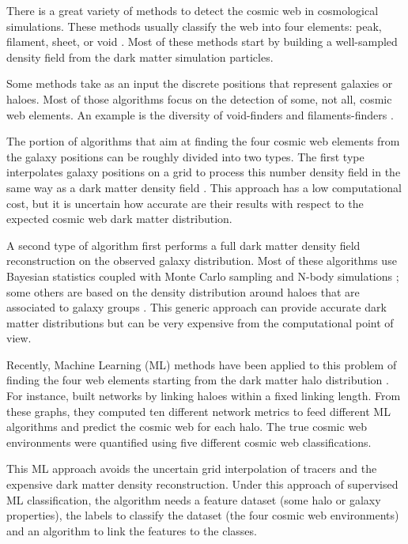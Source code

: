 \documentclass[usenatbib]{mnras}
\begin{document}
There is a great variety of methods to detect
the cosmic web in cosmological simulations.
These methods usually classify the web into four
elements: peak, filament, sheet, or void \citep{Libeskind2018}.
Most of these methods start by building a well-sampled density field from the dark matter simulation particles.

Some methods take as an input the discrete positions that represent galaxies or haloes.
Most of those algorithms focus on the detection of some, not all, cosmic web elements.
An example is the diversity of void-finders
\citep{Platen2007,Neyrinck2008} and filaments-finders
\citep{Novikov2003,Zhang2009,Sousbie2010,Chen2015,Luber2019}.   

The portion of algorithms that aim at finding the four cosmic web elements from the galaxy positions can be roughly divided into two types.
The first type interpolates galaxy positions on a grid to process this number density field in the same way as a dark matter density field \citep{Eardley2015,Alpaslan2016,Tojeiro2017,Shadab2019}.
This approach has a low computational cost, but it is uncertain 
how accurate are their results with respect to the expected cosmic web dark matter distribution.

A second type of algorithm first performs a full dark matter density field reconstruction on the observed galaxy distribution.
Most of these algorithms use Bayesian statistics coupled with Monte
Carlo sampling and N-body
simulations \citep{Jasche2010,Jasche2013a,Bos2014,LeclercqJasche2015,Horowitz2019,Burchett2020};
some others are based on the density distribution around haloes that are associated to galaxy groups \citep{Wang2009,Munoz-Cuartas2011}.
This generic approach can provide accurate dark matter distributions but can
be very expensive from the computational point of view.

Recently, Machine Learning (ML) methods 
have been applied to this problem of finding the four web elements
starting from the dark matter halo distribution \citep{Hui2018, Tsizh2019}.
For instance, 
\citep{Tsizh2019} built networks by linking haloes within a fixed linking length. 
From these graphs, they computed ten different network metrics to feed different ML algorithms and predict the cosmic web for each halo. The true cosmic web environments were quantified using five different cosmic web classifications.

This ML approach avoids the uncertain grid interpolation of
tracers and the expensive dark matter density reconstruction. 
Under this approach of supervised ML classification, 
the algorithm needs a feature dataset (some halo or galaxy
properties), the labels to classify the dataset (the four cosmic web
environments) and an algorithm to link the features to the classes.
\end{document}
